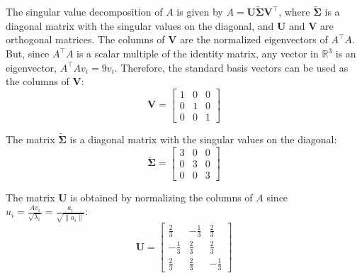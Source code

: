 \begin{homeworkProblem}
\begin{solution}
\begin{itemize}
                The singular value decomposition of $A$ is given by 
                $A = \mathbf{U} \tilde{\mathbf{\Sigma}} \mathbf{V}^\top$, where
                $\tilde{\mathbf{\Sigma}}$ is a diagonal matrix with the singular
                values on the diagonal, and $\mathbf{U}$ and $\mathbf{V}$ are 
                orthogonal matrices. The columns of $\mathbf{V}$ are the 
                normalized eigenvectors of $A^\top A$. But, since $A^\top A$ is
                a scalar multiple of the identity matrix, any vector in
                $\mathbb{R}^3$ is an eigenvector, $A^\top A v_i = 9 v_i$. 
                Therefore, the standard basis vectors can be used as the 
                columns of $\mathbf{V}$:
                \[
                    \mathbf{V} = \begin{bmatrix}
                        1 & 0 & 0 \\
                        0 & 1 & 0 \\
                        0 & 0 & 1
                    \end{bmatrix}
                \]

                The matrix $\tilde{\mathbf{\Sigma}}$ is a diagonal matrix with the
                singular values on the diagonal:
                \[
                    \tilde{\mathbf{\Sigma}} = \begin{bmatrix}
                        3 & 0 & 0 \\
                        0 & 3 & 0 \\
                        0 & 0 & 3
                    \end{bmatrix}
                \]

                The matrix $\mathbf{U}$ is obtained by normalizing the columns of $A$
                since $u_i = \frac{Av_i}{\sqrt{\lambda_i}} = 
                \frac{a_i}{\sqrt{\|a_i\|}}$:
                \[
                    \mathbf{U} = \begin{bmatrix}
                        \frac{2}{3} & -\frac{1}{3} & \frac{2}{3} \\
                        -\frac{1}{3} & \frac{2}{3} & \frac{2}{3} \\
                        \frac{2}{3} & \frac{2}{3} & -\frac{1}{3}
                    \end{bmatrix}
                \]


\end{itemize}
\end{solution}
\end{homeworkProblem}
